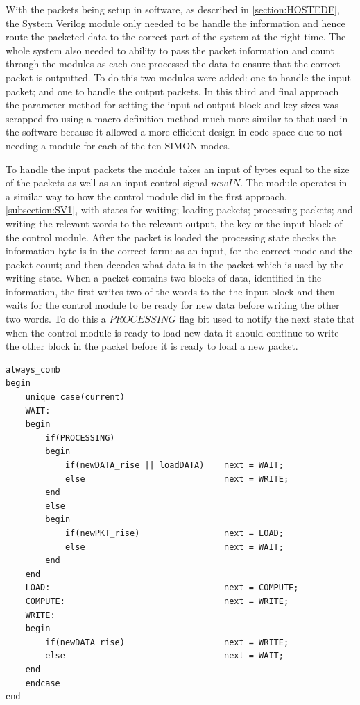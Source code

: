 \documentclass[12pt,twoside,a4paper]{report}
\begin{document}
	With the packets being setup in software, as described in \autoref{section:HOSTEDF}, the System Verilog module only needed to be handle the information and hence route the packeted data to the correct part of the system at the right time. The whole system also needed to ability to pass the packet information and count through the modules as each one processed the data to ensure that the correct packet is outputted. To do this two modules were added: one to handle the input packet; and one to handle the output packets. In this third and final approach the parameter method for setting the input ad output block and key sizes was scrapped fro using a macro definition method much more similar to that used in the software because it allowed a more efficient design in code space due to not needing a module for each of the ten SIMON modes.
	
	To handle the input packets the module takes an input of bytes equal to the size of the packets as well as an input control signal $newIN$. The module operates in a similar way to how the control module did in the first approach, \autoref{subsection:SV1}, with states for waiting; loading packets; processing packets; and writing the relevant words to the relevant output, the key or the input block of the control module. After the packet is loaded the processing state checks the information byte is in the correct form: as an input, for the correct mode and the packet count; and then decodes what data is in the packet which is used by the writing state. When a packet contains two blocks of data, identified in the information, the first writes two of the words to the the input block and then waits for the control module to be ready for new data before writing the other two words. To do this a $PROCESSING$ flag bit used to notify the next state that when the control module is ready to load new data it should continue to write the other block in the packet before it is ready to load a new packet.

 	\begin{minipage}{\linewidth}
	\begin{lstlisting}[label={lst:dataIN_next},caption={The next state logic used for the input packet handling module.},style=SVStyle]
always_comb
begin
	unique case(current)
	WAIT:
	begin
		if(PROCESSING)
		begin
			if(newDATA_rise || loadDATA)	next = WAIT;	
			else							next = WRITE;	
		end
		else
		begin
			if(newPKT_rise)					next = LOAD;
			else							next = WAIT;
		end
	end
	LOAD:									next = COMPUTE;
	COMPUTE:								next = WRITE;
	WRITE:
	begin
		if(newDATA_rise)					next = WRITE;
		else								next = WAIT;
	end
	endcase
end
	\end{lstlisting}
	\end{minipage}
	
\end{document}

